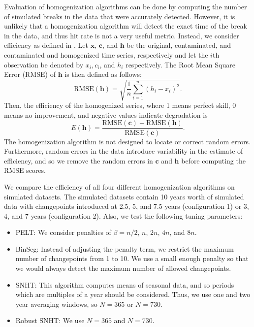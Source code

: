 \documentclass[12pt]{article}
\begin{document}
\begin{doublespacing}
Evaluation of homogenization algorithms can be done by computing the number of simulated breaks in the data that were accurately detected.  However, it is unlikely that a homogenization algorithm will detect the exact time of the break in the data, and thus hit rate is not a very useful metric.  Instead, we consider efficiency as defined in \cite{domonkos13}.  Let $\mathbf{x}$, $\mathbf{c}$, and $\mathbf{h}$ be the original, contaminated, and contaminated and homogenized time series, respectively and let the $i$th observation be denoted by $x_i, c_i$, and $h_i$ respectively.  The Root Mean Square Error (RMSE) of $\mathbf{h}$ is then defined as follows:
\begin{equation*}
	\mbox{RMSE}(\mathbf{h}) = \sqrt{\frac{1}{n} \sum_{i=1}^n (h_i-x_i)^2}.
\end{equation*}
Then, the efficiency of the homogenized series, where 1 means perfect skill, 0 means no improvement, and negative values indicate degradation is
\begin{equation*}
	E(\mathbf{h}) = \frac{\mbox{RMSE}(\mathbf{c})-\mbox{RMSE}(\mathbf{h})}{\mbox{RMSE}(\mathbf{c})}.
\end{equation*}
The homogenization algorithm is not designed to locate or correct random errors.  Furthermore, random errors in the data introduce variability in the estimate of efficiency, and so we remove the random errors in $\mathbf{c}$ and $\mathbf{h}$ before computing the RMSE scores.  

We compare the efficiency of all four different homogenization algorithms on simulated datasets.  The simulated datasets contain 10 years worth of simulated data with changepoints introduced at 2.5, 5, and 7.5 years (configuration 1) or 3, 4, and 7 years (configuration 2).  Also, we test the following tuning parameters:

\begin{itemize}
	\item PELT: We consider penalties of $\beta=n/2$, $n$, $2n$, $4n$, and  $8n$.
	\item BinSeg: Instead of adjusting the penalty term, we restrict the maximum number of changepoints from 1 to 10.  We use a small enough penalty so that we would always detect the maximum number of allowed changepoints.
	\item SNHT: This algorithm computes means of seasonal data, and so periods which are multiples of a year should be considered.  Thus, we use one and two year averaging windows, so $N=365$ or $N=730$.
	\item Robust SNHT: We  use $N=365$ and $N= 730$.
\end{itemize}


\end{doublespacing}
\end{document}
